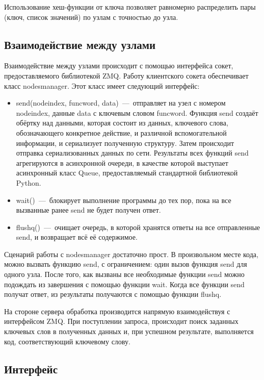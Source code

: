 \documentclass[12pt,a4paper,oneside]{extarticle}
\begin{document}
            Использование хеш-функции от ключа позволяет равномерно распределить пары (ключ, список значений) по узлам с точностью до узла.
    \clearpage 

    \subsection{Взаимодействие между узлами}
        Взаимодействие между узлами происходит с помощью интерфейса сокет, предоставляемого библиотекой ZMQ.
        Работу клиентского сокета обеспечивает класс nodes\textunderscore manager. Этот класс имеет следующий интерфейс:
        \begin{itemize}
            \item send(node\textunderscore index, func\textunderscore word, data)~---~отправляет на узел с номером node\textunderscore index, данные data с ключевым словом func\textunderscore word. Функция send создаёт обёртку над данными, которая состоит из данных, ключевого слова, обозначающего конкретное действие, и различной вспомогательной информации, и сериализует полученную структуру. Затем происходит отправка сериализованных данных по сети. Результаты всех функций send агрегируются в асинхронной очереди, в качестве которой выступает асинхронный класс Queue, предоставляемый стандартной библиотекой Python.
            \item wait()~---~блокирует выполнение программы до тех пор, пока на все вызванные ранее send не будет получен ответ.
            \item flush\textunderscore q()~---~очищает очередь, в которой хранятся ответы на все отправленные send, и возвращает всё её содержимое.
        \end{itemize}

        Сценарий работы с nodes\textunderscore manager достаточно прост. В произвольном месте кода, можно вызвать функцию send, с ограничением: один вызов функция send для одного узла. После того, как вызваны все необходимые функции send можно подождать из завершения с помощью функции wait. Когда все функции send получат ответ, из результаты получаются с помощью функции flush\textunderscore q.

        На стороне сервера обработка производится напрямую взаимодействуя с интерфейсом ZMQ. При поступлении запроса, происходит поиск заданных ключевых слов в полученных данных и, при успешном результате, выполняется код, соответствующий ключевому слову.
    \clearpage

    \subsection{Интерфейс}
\end{document}
